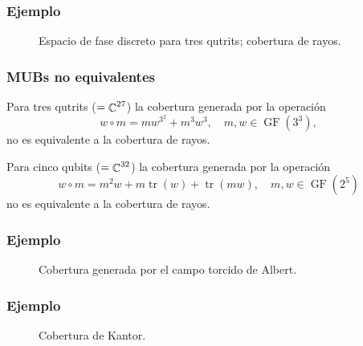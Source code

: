 \documentclass[10pt,spanish]{beamer}
\DeclareMathOperator{\C}{\mathbb{C}}
\let\H\relax
\DeclareMathOperator{\H}{\mathcal H}
\DeclareMathOperator{\tr}{tr}
\DeclareMathOperator{\GF}{GF}
\begin{document}
  \begin{frame}
    \frametitle{Ejemplo}

    \begin{figure}[h]
      \centering
      \scalebox{0.45}{
        
      }
      \caption{Espacio de fase discreto para tres qutrits;
      cobertura de rayos.}
      \label{fig:affine-desargues-3-3}
    \end{figure}
  \end{frame}

  \begin{frame}
    \frametitle{MUBs no equivalentes}

    \begin{example}
      Para tres qutrits ($\H = \C^{27}$) la cobertura
      generada por la operación
      \begin{equation}
        w \circ m = m w^{3^2} + m^{3} w^{3},
        \quad m,w \in \GF(3^{3}),
      \end{equation}
      no es equivalente a la cobertura de rayos.
    \end{example}

    \begin{example}[Kantor]
      Para cinco qubits ($\H = \C^{32}$) la cobertura
      generada por la operación
      \begin{equation}
        w \circ m = m^2 w + m \tr(w) + \tr(mw),
        \quad m,w \in \GF(2^{5})
      \end{equation}
      no es equivalente a la cobertura de rayos.
    \end{example}
  \end{frame}

  \begin{frame}
    \frametitle{Ejemplo}
    \begin{figure}[h]
      \centering
      \scalebox{0.5}{
        
      }
      \caption{Cobertura generada por el campo torcido de
      Albert.}
      \label{fig:affine-albert-3-3}
    \end{figure}
  \end{frame}

  \begin{frame}
    \frametitle{Ejemplo}
    \begin{figure}[h]
      \centering
      \scalebox{0.5}{
        
      }
      \caption{Cobertura de Kantor.}
      \label{fig:affine-kantor-2-5}
    \end{figure}
  \end{frame}
\end{document}
